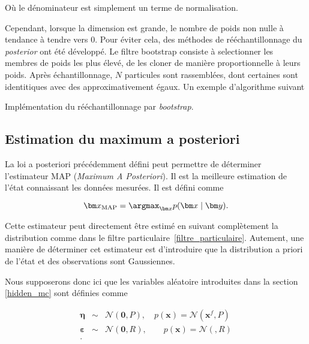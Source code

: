 Où le dénominateur est simplement un terme de normalisation.

Cependant, lorsque la dimension est grande, le nombre de poids non nulle à tendance à tendre vers 0. Pour éviter cela, des méthodes de rééchantillonnage du \textit{posterior} ont été développé. Le filtre bootstrap \cite{gordon_1993} consiste à selectionner les membres de poids les plus élevé, de les cloner de manière proportionnelle à leurs poids. Après échantillonnage, $N$ particules sont rassemblées, dont certaines sont identitiques avec des approximativement égaux.
Un exemple d'algorithme suivant

\begin{algorithm}
    \caption{Implémentation du rééchantillonnage par \textit{bootstrap}.}
    \For{membre $n$ do}{
    Tirer $u$ dans $\mathcal{U}[0,1[$\;
    Initialiser $j=1$\;
    Affecter $S_w = w^1$\;
    \While{$S_w < u$}{
        $j = j+1$\;
        $S_w = S_w + w(j)\;$
    }
    Le membre $j$  est conservé et remplace le membre $n$.
    }
\end{algorithm}

\subsection{Estimation du maximum a posteriori}

La loi a posteriori précédemment défini peut permettre de déterminer l'estimateur MAP (\textit{Maximum A Posteriori}). Il est la meilleure estimation de l'état connaissant les données mesurées. Il est défini comme

\begin{equation*}
    \bm x_{\text{MAP}} = \argmax_{\bm x} p(\bm x \mid \bm y).
\end{equation*}

Cette estimateur peut directement être estimé en suivant complètement la distribution comme dans le filtre particulaire~\ref{filtre_particulaire}.
Autement, une manière de déterminer cet estimateur est d'introduire que la distribution a priori de l'état et des observations sont Gaussiennes.

Nous supposerons donc ici que les variables aléatoire introduites dans la section \ref{hidden_mc} sont définies comme

\begin{eqnarray*}
    \bm \eta &\sim& \mathcal{N}(\bm 0, P), \quad p(\bm x) = \mathcal{N}(\bm x^f, P)\\
    \bm \varepsilon & \sim & \mathcal N(\bm 0, R), \quad \quad p(\bm x) = \mathcal{N}(\bm , R)\\.
\end{eqnarray*}

